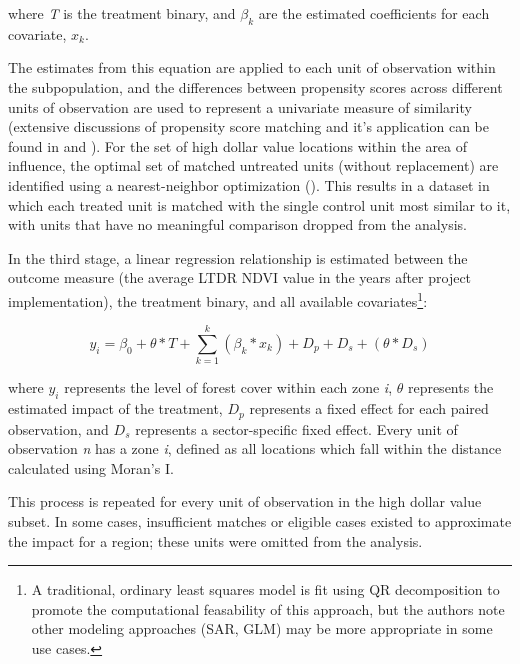 \documentclass[sustainability,article,submit,moreauthors,pdftex,10pt,a4paper]{mdpi}
\begin{document}
where \textit{T} is the treatment binary, and \begin{math}\beta_{k}\end{math} are the estimated coefficients for each covariate, \begin{math}x_{k}\end{math}.  
\par
The estimates from this equation are applied to each unit of observation within the subpopulation, and the differences between propensity scores across different units of observation are used to represent a univariate measure of similarity (extensive discussions of propensity score matching and it's application can be found in \cite{rubin_estimating_1997} and \cite{abbay_does_2015}). For the set of high dollar value locations within the area of influence, the optimal set of matched untreated units (without replacement) are identified using a nearest-neighbor optimization (\cite{ho_matchit:_2011}). This results in a dataset in which each treated unit is matched with the single control unit most similar to it, with units that have no meaningful comparison dropped from the analysis.
\par
In the third stage, a linear regression relationship is estimated between the outcome measure (the average LTDR NDVI value in the years after project implementation), the treatment binary, and all available covariates\footnote{A traditional, ordinary least squares model is fit using QR decomposition to promote the computational feasability of this approach, but the authors note other modeling approaches (SAR, GLM) may be more appropriate in some use cases.}:

\begin{equation}
y_i = \beta_{0} + \theta * T + \sum_{k=1}^{k}(\beta_{k}*x_{k}) + D_{p} + D_{s} + (\theta * D_{s})
\label{EQgwr}
\end{equation}

where \begin{math}y_{i}\end{math} represents the level of forest cover within each zone \textit{i}, \begin{math}\theta\end{math} represents the estimated impact of the treatment, \begin{math}D_{p}\end{math} represents a fixed effect for each paired observation, and \begin{math}D_{s}\end{math} represents a sector-specific fixed effect.
Every unit of observation \textit{n} has a zone \textit{i}, defined as all locations which fall within the distance calculated using Moran's I.
\par
This process is repeated for every unit of observation in the high dollar value subset.  
In some cases, insufficient matches or eligible cases existed to approximate the impact for a region; these units were omitted from the analysis.
\end{document}

